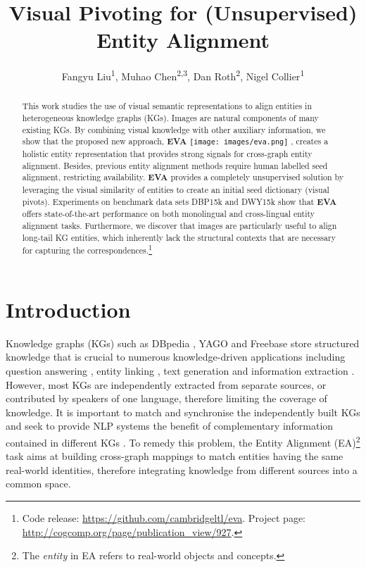 \documentclass[letterpaper]{article} \usepackage{aaai21}  \usepackage{times}  \usepackage{helvet} \usepackage{courier}  \usepackage[hyphens]{url}  \usepackage{graphicx} \urlstyle{rm} \def\UrlFont{\rm}  \usepackage{natbib}  \usepackage{caption} \frenchspacing  \setlength{\pdfpagewidth}{8.5in}  \setlength{\pdfpageheight}{11in}
\title{Visual Pivoting for (Unsupervised) Entity Alignment}
\author {
Fangyu Liu\textsuperscript{\rm 1},
    Muhao Chen\textsuperscript{\rm 2,3},
    Dan Roth\textsuperscript{\rm 2}, 
    Nigel Collier\textsuperscript{\rm 1}  \\
}
\newcommand{\modelname}[0]{\textbf{\textsc{EVA}}\xspace}
\begin{document}
\maketitle

\begin{abstract}
This work studies the use of visual semantic representations to align entities in heterogeneous knowledge graphs (KGs). Images are natural components of many existing KGs. By combining visual knowledge with other auxiliary information,
we show that the proposed new approach,  \modelname
\texttt{[image: images/eva.png]}
, creates a holistic entity representation that provides strong signals for cross-graph entity alignment. 
Besides, previous entity alignment methods require human labelled seed alignment, restricting availability.
\modelname provides a completely unsupervised solution by leveraging the visual similarity of entities to create an initial seed dictionary (visual pivots). Experiments on benchmark data sets DBP15k and DWY15k show that \modelname offers state-of-the-art performance on both monolingual and cross-lingual entity alignment tasks.
Furthermore, we discover that images are particularly useful to align long-tail KG entities, which inherently lack the structural contexts that are necessary for capturing the correspondences.\footnote{Code release: \url{https://github.com/cambridgeltl/eva}. Project page: \url{http://cogcomp.org/page/publication_view/927}.}
\end{abstract}
 \section{Introduction}





Knowledge graphs (KGs) such as DBpedia \citep{lehmann2015dbpedia}, YAGO \citep{rebele2016yago} and Freebase \citep{bollacker2008freebase} store structured knowledge that is crucial to
numerous knowledge-driven applications including question answering \citep{cui2017kbqa}, entity linking \citep{radhakrishnan2018elden}, text generation \citep{koncel2019text} and information extraction \citep{hoffmann2011knowledge}.  
However, most KGs are independently extracted from separate sources, or contributed by speakers of one language, therefore limiting the coverage of knowledge. It is important to match and synchronise the independently built KGs and seek to provide NLP systems the benefit of complementary information contained in different KGs \citep{bleiholder2009data,bryl2014learning}.
To remedy this problem, the Entity Alignment (EA)\footnote{The \emph{entity} in EA refers to real-world objects and concepts.} task aims at building cross-graph mappings to match 
entities having the same real-world identities,
therefore integrating knowledge from different sources into a common space.
\end{document}
